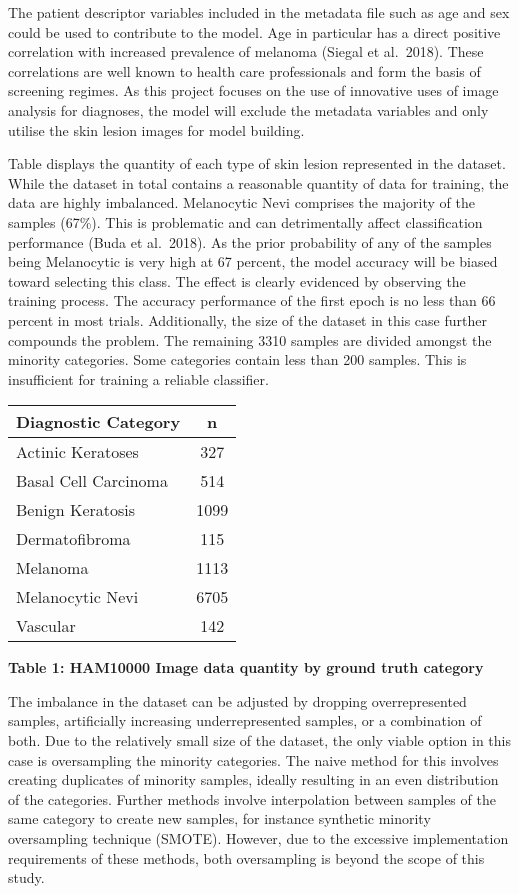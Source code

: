 \documentclass[11pt]{article}
\begin{document}
The patient descriptor variables included in the metadata file such as
age and sex could be used to contribute to the model. Age in particular
has a direct positive correlation with increased prevalence of melanoma
(Siegal et al.~2018). These correlations are well known to health care
professionals and form the basis of screening regimes. As this project
focuses on the use of innovative uses of image analysis for diagnoses,
the model will exclude the metadata variables and only utilise the skin
lesion images for model building.

Table displays the quantity of each type of skin lesion represented in
the dataset. While the dataset in total contains a reasonable quantity
of data for training, the data are highly imbalanced. Melanocytic Nevi
comprises the majority of the samples (67\%). This is problematic and
can detrimentally affect classification performance (Buda et al.~2018).
As the prior probability of any of the samples being Melanocytic is very
high at 67 percent, the model accuracy will be biased toward selecting
this class. The effect is clearly evidenced by observing the training
process. The accuracy performance of the first epoch is no less than 66
percent in most trials. Additionally, the size of the dataset in this
case further compounds the problem. The remaining 3310 samples are
divided amongst the minority categories. Some categories contain less
than 200 samples. This is insufficient for training a reliable
classifier.

\begin{longtable}[]{@{}lc@{}}
\toprule
Diagnostic Category & n\tabularnewline
\midrule
\endhead
Actinic Keratoses & 327\tabularnewline
Basal Cell Carcinoma & 514\tabularnewline
Benign Keratosis & 1099\tabularnewline
Dermatofibroma & 115\tabularnewline
Melanoma & 1113\tabularnewline
Melanocytic Nevi & 6705\tabularnewline
Vascular & 142\tabularnewline
\bottomrule
\end{longtable}

\textbf{Table 1: HAM10000 Image data quantity by ground truth category}

The imbalance in the dataset can be adjusted by dropping overrepresented
samples, artificially increasing underrepresented samples, or a
combination of both. Due to the relatively small size of the dataset,
the only viable option in this case is oversampling the minority
categories. The naive method for this involves creating duplicates of
minority samples, ideally resulting in an even distribution of the
categories. Further methods involve interpolation between samples of the
same category to create new samples, for instance synthetic minority
oversampling technique (SMOTE). However, due to the excessive
implementation requirements of these methods, both oversampling is
beyond the scope of this study.
\end{document}
